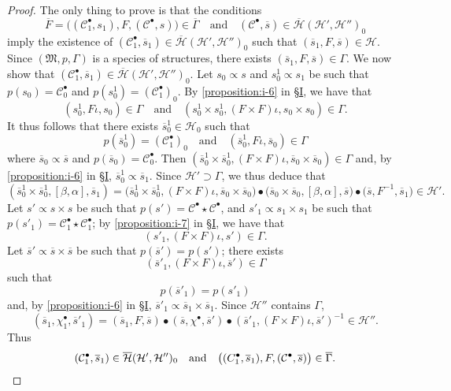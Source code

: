 \documentclass[a4paper,fleqn]{article}
\theoremstyle{plain}
\theoremstyle{definition}
\newcommand{\textand}{\quad\text{and}\quad}
\newcommand{\CC}{\mathcal{C}}
\newcommand{\HH}{\mathcal{H}}
\newcommand{\bHH}{\overline{\HH}}
\newcommand{\MM}{\mathfrak{M}}
\newcommand{\subs}{\mathrel{\propto}}
\begin{document}
\begin{proof}
  The only thing to prove is that the conditions
  \[
    \overline{F}
    = \big((\CC_1^\bullet,s_1),F,(\CC^\bullet,s)\big)
    \in\overline{\Gamma}
    \textand
    (\CC^\bullet,\overline{s})
    \in\bHH(\HH',\HH'')_0
  \]
  imply the existence of $(\CC_1^\bullet,\overline{s}_1)\in\bHH(\HH',\HH'')_0$ such that $(\overline{s}_1,F,\overline{s})\in\HH$.
  Since $(\MM,p,\Gamma)$ is a species of structures, there exists $(\overline{s}_1,F,\overline{s})\in\Gamma$.
  We now show that $(\CC_1^\bullet,\overline{s}_1)\in\bHH(\HH',\HH'')_0$.
  Let $s_0\subs s$ and $s_0^1\subs s_1$ be such that $p(s_0)=\CC_0^\bullet$ and $p(s_0^1)=(\CC_1^\bullet)_0$.
  By \cref{proposition:i-6} in \hyperref[section:i]{§I}, we have that
  \[
    (s_0^1,F\iota,s_0)
    \in\Gamma
    \textand
    (s_0^1\times s_0^1,(F\times F)\iota,s_0\times s_0)
    \in\Gamma.
  \]
  It thus follows that there exists $\overline{s}_0^1\in\HH_0$ such that
  \[
    p(\overline{s}_0^1)
    = (\CC_1^\bullet)_0
    \textand
    (\overline{s}_0^1,F\iota,\overline{s}_0)
    \in\Gamma
  \]
  where $\overline{s}_0\subs\overline{s}$ and $p(\overline{s}_0)=\CC_0^\bullet$.
  Then $(\overline{s}_0^1\times\overline{s}_0^1,(F\times F)\iota,\overline{s}_0\times\overline{s}_0)\in\Gamma$ and, by \cref{proposition:i-6} in \hyperref[section:i]{§I}, $\overline{s}_0^1\subs\overline{s}_1$.
  Since $\HH'\supset\Gamma$, we thus deduce that
  \[
    (\overline{s}_0^1\times\overline{s}_0^1,[\beta,\alpha],\overline{s}_1)
    = \big(
      \overline{s}_0^1\times\overline{s}_0^1, (F\times F)\iota, \overline{s}_0\times\overline{s}_0
    \big)
    \bullet \big(
      \overline{s}_0\times\overline{s}_0, [\beta,\alpha], \overline{s}
    \big)
    \bullet \big(
      \overline{s}, F^{-1}, \overline{s}_1
    \big)
    \in \HH'.
  \]
  Let $s'\subs s\times s$ be such that $p(s')=\CC^\bullet\star\CC^\bullet$, and $s'_1\subs s_1\times s_1$ be such that $p(s'_1)=\CC_1^\bullet\star\CC_1^\bullet$;
  by \cref{proposition:i-7} in \hyperref[section:i]{§I}, we have that
  \[
    (s'_1,(F\times F)\iota,s')
    \in\Gamma.
  \]
  Let $\overline{s}'\subs\overline{s}\times\overline{s}$ be such that $p(\overline{s}')=p(s')$;
  there exists
  \[
    (\overline{s}'_1,(F\times F)\iota,\overline{s}')
    \in\Gamma
  \]
  such that
  \[
    p(\overline{s}'_1)
    = p(s'_1)
  \]
  and, by \cref{proposition:i-6} in \hyperref[section:i]{§I}, $\overline{s}'_1\subs\overline{s}_1\times\overline{s}_1$.
  Since $\HH''$ contains $\Gamma$,
  \[
    (\overline{s}_1,\chi_1^\bullet,\overline{s}'_1)
    = (\overline{s}_1,F,\overline{s})
    \bullet (\overline{s},\chi^\bullet,\overline{s}')
    \bullet(\overline{s}'_1,(F\times F)\iota,\overline{s}')^{-1}
    \in\HH''.
  \]
  Thus
  \[
    (\CC_1^\bullet,\overline{s}_1)
    \in\bHH(\HH',\HH'')_0
    \textand
    \big(
      (C_1^\bullet,\overline{s}_1), F, (\CC^\bullet,\overline{s})
    \big)
    \in\overline{\Gamma}.
    \qedhere
  \]
\end{proof}
\end{document}
